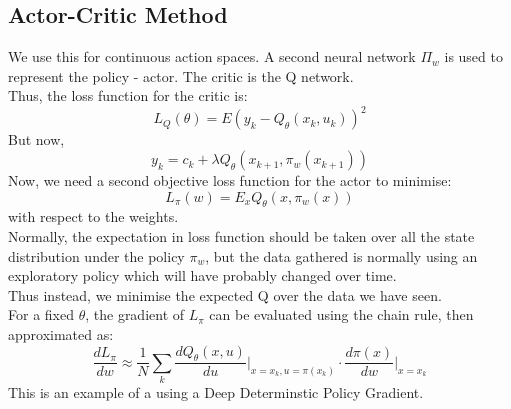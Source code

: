 \documentclass{article}
\begin{document}
\subsection{Actor-Critic Method}
We use this for continuous action spaces. A second neural network $\Pi_w$ is used to represent the policy - actor. The critic is the Q network. \\
Thus, the loss function for the critic is:
\[
L_Q(\theta) = E(y_k - Q_\theta(x_k,u_k))^2
\]
But now, 
\[
y_k = c_k + \lambda Q_\theta(x_{k+1},\pi_w(x_{k+1}))
\]
Now, we need a second objective loss function for the actor to minimise:
\[
L_\pi(w) = E_xQ_\theta(x,\pi_w(x))
\]
with respect to the weights. 
\\
Normally, the expectation in loss function should be taken over all the state distribution under the policy $\pi_w$, but the data gathered is normally using an exploratory policy which will have probably changed over time. \\
Thus instead, we minimise the expected Q over the data we have seen. \\
For a fixed $\theta$, the gradient of $L_\pi$ can be evaluated using the chain rule, then approximated as:
\[
\frac{dL_\pi}{dw} \approx \frac{1}{N} \sum_k \frac{dQ_\theta(x,u)}{du}\Bigg |_{x=x_k,u=\pi(x_k)} \cdot 
\frac{d \pi(x)}{dw}\Bigg |_{x=x_k}
\]
This is an example of a using a Deep Determinstic Policy Gradient.
\end{document}
